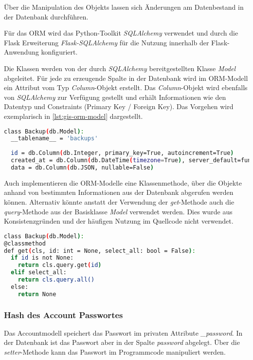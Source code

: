 Über die Manipulation des Objekts lassen sich Änderungen am Datenbestand in der \linebreak Datenbank durchführen. 

Für das ORM wird das Python-Toolkit \textit{SQLAlchemy} verwendet und durch die Flask Erweiterung \textit{Flask-SQLAlchemy} für die Nutzung innerhalb der Flask-Anwendung konfiguriert. 

Die Klassen werden von der durch \textit{SQLAlchemy} bereitgestellten Klasse \textit{Model} abgeleitet. Für jede zu erzeugende Spalte in der Datenbank wird im ORM-Modell ein Attribut vom Typ \linebreak \textit{Column}-Objekt erstellt. Das \textit{Column}-Objekt wird ebenfalls von \textit{SQLAlchemy} zur Verfügung gestellt und erhält Informationen wie den Datentyp und Constraints (Primary Key / Foreign Key).
Das Vorgehen wird exemplarisch in \autoref{lst:gis-orm-model} dargestellt.

\begin{lstlisting}[language=bash, frame=single, caption={GIS Beispiel eines ORM Models}, captionpos=b, label={lst:gis-orm-model}]
class Backup(db.Model):
  __tablename__ = 'backups'
  
  id = db.Column(db.Integer, primary_key=True, autoincrement=True)
  created_at = db.Column(db.DateTime(timezone=True), server_default=func.now(), nullable=False)
  data = db.Column(db.JSON, nullable=False)
\end{lstlisting}

Auch implementieren die ORM-Modelle eine Klassenmethode, über die Objekte anhand von bestimmten Informationen aus der Datenbank abgerufen werden können. Alternativ könnte anstatt der Verwendung der \textit{get}-Methode auch die \textit{query}-Methode aus der Basisklasse \textit{Model} verwendet werden. Dies wurde aus Konsistenzgründen und der häufigen Nutzung im Quellcode nicht verwendet.

\begin{lstlisting}[language=bash, frame=single, caption={GIS Beispiel einer Get-Methode des ORM Models}, captionpos=b, label={lst:gis-orm-model-get}]
class Backup(db.Model):
@classmethod
def get(cls, id: int = None, select_all: bool = False):
  if id is not None:
    return cls.query.get(id)
  elif select_all:
    return cls.query.all()
  else:
    return None
\end{lstlisting}

\subsubsection{Hash des Account Passwortes}
Das Accountmodell speichert das Passwort im privaten Attribute \textit{\_password}. In der Datenbank ist das Passwort aber in der Spalte \textit{password} abgelegt. Über die \textit{setter}-Methode kann das Passwort im Programmcode manipuliert werden.

